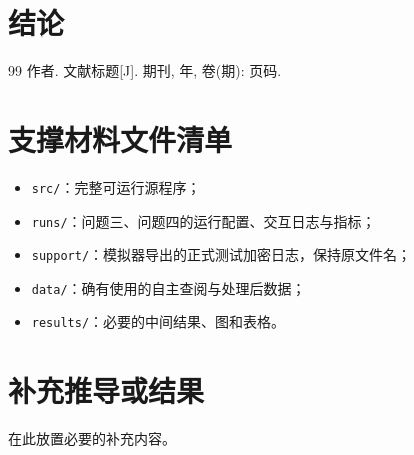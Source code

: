 \documentclass[UTF8,zihao=-4]{ctexart}
\begin{document}
\section{结论}


\begin{thebibliography}{99}
 作者. 文献标题[J]. 期刊, 年, 卷(期): 页码.
\end{thebibliography}

\appendix
\section{支撑材料文件清单}
\begin{itemize}[leftmargin=2em]
  \item \texttt{src/}：完整可运行源程序；
  \item \texttt{runs/}：问题三、问题四的运行配置、交互日志与指标；
  \item \texttt{support/}：模拟器导出的正式测试加密日志，保持原文件名；
  \item \texttt{data/}：确有使用的自主查阅与处理后数据；
  \item \texttt{results/}：必要的中间结果、图和表格。
\end{itemize}

\section{补充推导或结果}
在此放置必要的补充内容。
\end{document}
